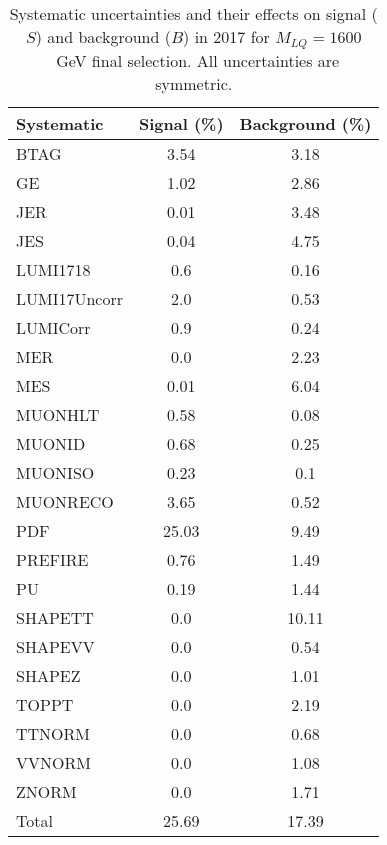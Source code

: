 \begin{table}[htbp]
\begin{center}
\caption{Systematic uncertainties and their effects on signal ($S$) and background ($B$) in 2017 for $M_{LQ}=1600$~GeV final selection. All uncertainties are symmetric.}
\begin{tabular}{lcc}
\hline\hline
Systematic & Signal (\%) & Background (\%) \\ \hline 
BTAG & 3.54 & 3.18\\ 
GE & 1.02 & 2.86\\ 
JER & 0.01 & 3.48\\ 
JES & 0.04 & 4.75\\ 
LUMI1718 & 0.6 & 0.16\\ 
LUMI17Uncorr & 2.0 & 0.53\\ 
LUMICorr & 0.9 & 0.24\\ 
MER & 0.0 & 2.23\\ 
MES & 0.01 & 6.04\\ 
MUONHLT & 0.58 & 0.08\\ 
MUONID & 0.68 & 0.25\\ 
MUONISO & 0.23 & 0.1\\ 
MUONRECO & 3.65 & 0.52\\ 
PDF & 25.03 & 9.49\\ 
PREFIRE & 0.76 & 1.49\\ 
PU & 0.19 & 1.44\\ 
SHAPETT & 0.0 & 10.11\\ 
SHAPEVV & 0.0 & 0.54\\ 
SHAPEZ & 0.0 & 1.01\\ 
TOPPT & 0.0 & 2.19\\ 
TTNORM & 0.0 & 0.68\\ 
VVNORM & 0.0 & 1.08\\ 
ZNORM & 0.0 & 1.71\\ 
Total & 25.69 & 17.39\\ \hline \hline
\end{tabular}
\label{tab:SysUncertainties_uujj_1600}
\end{center}
\end{table}


